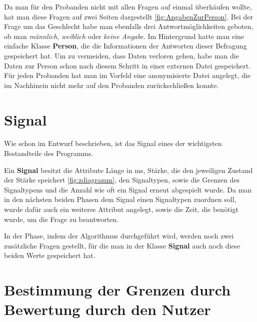 Da man f{\"u}r den Probanden nicht mit allen Fragen auf einmal {\"u}berh{\"a}ufen wollte, hat man diese Fragen auf zwei Seiten dargestellt \autoref{fig:AngabenZurPerson}. Bei der Frage um das Geschlecht habe man ebenfalls drei Antwortm{\"o}glichkeiten geboten, ob man \textit{m{\"a}nnlich}, \textit{weiblich} oder \textit{keine Angabe}.
Im Hintergrund hatte man eine einfache Klasse \textbf{Person}, die die Informationen der Antworten dieser Befragung gespeichert hat. Um zu vermeiden, dass Daten verloren gehen, habe man die Daten zur Person schon nach diesem Schritt in einer externen Datei gespeichert. F{\"u}r jeden Probanden hat man im Vorfeld eine anonymisierte Datei angelegt, die im Nachhinein nicht mehr auf den Probanden zur{\"u}ckschlie{\ss}en konnte.  

\section{Signal}
Wie schon im Entwurf beschrieben, ist das Signal eines der wichtigsten Bestandteile des Programms.

Ein \textbf{Signal} besitzt die Attribute L{\"a}nge in ms, St{\"a}rke, die den jeweiligen Zustand der St{\"a}rke speichert \autoref{fig:zdiagramm}, den Signaltypen, sowie die Grenzen des Signaltypens und die Anzahl wie oft ein Signal erneut abgespielt wurde. 
Da man in den n{\"a}chsten beiden Phasen dem Signal einen Signaltypen zuordnen soll, wurde daf{\"u}r auch ein weiteres Attribut angelegt, sowie die Zeit, die ben{\"o}tigt wurde, um die Frage zu beantworten.

In der Phase, indem der Algorithmus durchgef{\"u}hrt wird, werden noch zwei zus{\"a}tzliche Fragen gestellt, f{\"u}r die man in der Klasse \textbf{Signal} auch noch diese beiden Werte gespeichert hat.


\section {Bestimmung der Grenzen durch Bewertung durch den Nutzer}


